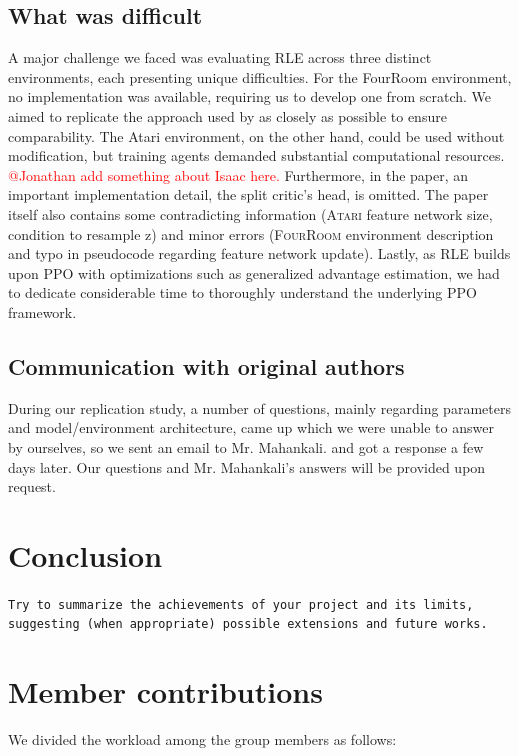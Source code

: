 \documentclass[10pt]{article} %
\begin{document}
\subsection{What was difficult}
A major challenge we faced was evaluating RLE across three distinct environments, each presenting unique difficulties. For the FourRoom environment, no implementation was available, requiring us to develop one from scratch. We aimed to replicate the approach used by \cite{rle-paper} as closely as possible to ensure comparability. The Atari environment, on the other hand, could be used without modification, but training agents demanded substantial computational resources. \textcolor{red}{@Jonathan add something about Isaac here.} Furthermore, in the paper, an important implementation detail, the split critic's head, is omitted. The paper itself also contains some contradicting information (\textsc{Atari} feature network size, condition to resample z) and minor errors (\textsc{FourRoom} environment description and typo in pseudocode regarding feature network update). Lastly, as RLE builds upon PPO with optimizations such as generalized advantage estimation, we had to dedicate considerable time to thoroughly understand the underlying PPO framework. 


\subsection{Communication with original authors}

\noindent During our replication study, a number of questions, mainly regarding parameters and model/environment architecture, came up which we were unable to answer by ourselves, so we sent an email to Mr. Mahankali. and got a response a few days later. Our questions and Mr. Mahankali's answers will be provided upon request. 

\section{Conclusion}
\texttt{Try to summarize the achievements of your project and its limits, suggesting (when appropriate) possible extensions and future works.}

\section*{Member contributions}

\noindent We divided the workload among the group members as follows:
\end{document}
